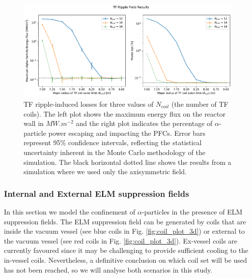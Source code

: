 \documentclass[10pt, a4paper, twoside]{article}
\begin{document}
\begin{figure}[!htb]
    \centering
    \includegraphics[width=0.99\linewidth]{Figures/max_and_total_flux_vs_rcoil.pdf}
    \caption{TF ripple-induced losses for three values of $N_{coil}$ (the number of TF coils). The left plot shows the maximum energy flux on the reactor wall in $\si{MW.m^{-2}}$ and the right plot indicates the percentage of $\alpha$-particle power escaping and impacting the PFCs. Error bars represent 95\% confidence intervals, reflecting the statistical uncertainty inherent in the Monte Carlo methodology of the simulation. The black horizontal dotted line shows the results from a simulation where we used only the axisymmetric field.}
    \label{fig:max_and_total_flux_vs_rcoil_and_ncoil}
\end{figure}

\subsubsection{Internal and External ELM suppression fields}
\label{sec:elm_suppression_field}

In this section we model the confinement of $\alpha$-particles in the presence of ELM suppression fields.
The ELM suppression field can be generated by coils that are inside the vacuum vessel (see blue coils in Fig. \ref{fig:coil_plot_3d}) or external to the vacuum vessel (see red coils in Fig. \ref{fig:coil_plot_3d}). Ex-vessel coils are currently favoured since it may be challenging to provide sufficient cooling to the in-vessel coils. Nevertheless, a definitive conclusion on which coil set will be used has not been reached, so we will analyse both scenarios in this study.
\end{document}
